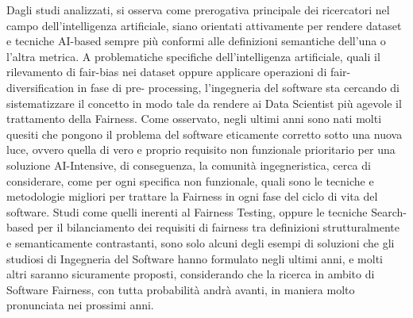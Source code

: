 Dagli studi analizzati, si osserva come prerogativa principale dei ricercatori nel campo dell'intelligenza artificiale, siano orientati attivamente per rendere dataset e tecniche AI-based sempre più conformi alle definizioni semantiche dell'una o l'altra metrica. A problematiche specifiche dell'intelligenza artificiale, quali il rilevamento di fair-bias nei dataset oppure applicare operazioni di fair-diversification in fase di pre- processing, l'ingegneria del software sta cercando di sistematizzare il concetto in modo tale da rendere ai Data Scientist più agevole il trattamento della Fairness. Come osservato, negli ultimi anni sono nati molti quesiti che pongono il problema del software eticamente corretto sotto una nuova luce, ovvero quella di vero e proprio requisito non funzionale prioritario per una soluzione AI-Intensive, di conseguenza, la comunità ingegneristica, cerca di considerare, come per ogni specifica non funzionale, quali sono le tecniche e metodologie migliori per trattare la Fairness in ogni fase del ciclo di vita del software. Studi come quelli inerenti al Fairness Testing, oppure le tecniche Search-based per il bilanciamento dei requisiti di fairness tra definizioni strutturalmente e semanticamente contrastanti, sono solo alcuni degli esempi di soluzioni che gli studiosi di Ingegneria del Software hanno formulato negli ultimi anni, e molti altri saranno sicuramente proposti, considerando che la ricerca in ambito di Software Fairness, con tutta probabilità andrà avanti, in maniera molto pronunciata nei prossimi anni.\\\\

